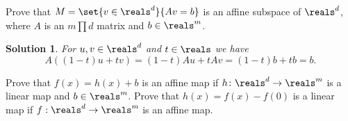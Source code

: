 \documentclass[article, a4paper, 11pt, oneside]{memoir}
\numberwithin{equation}{chapter}
\theoremstyle{nonumberplain}
\newtheorem{solution}{Solution}
\begin{document}

\begin{exerciseframed*}[4]
    Prove that $M = \set{v \in \reals^d}{Av = b}$ is an affine subspace of $\reals^d$, where $A$ is an $m \prod d$ matrix and $b \in \reals^m$.
\end{exerciseframed*}

\begin{solution}
    For $u,v \in \reals^d$ and $t \in \reals$ we have
    \begin{equation*}
        A((1-t)u + tv)
            = (1-t)Au + tAv
            = (1-t)b + tb
            = b.
    \end{equation*}
\end{solution}


\begin{exerciseframed*}[9]
    Prove that $f(x) = h(x) + b$ is an affine map if $h \colon \reals^d \to \reals^m$ is a linear map and $b \in \reals^m$. Prove that $h(x) = f(x) - f(0)$ is a linear map if $f : \reals^d \to \reals^m$ is an affine map.
\end{exerciseframed*}
\end{document}
